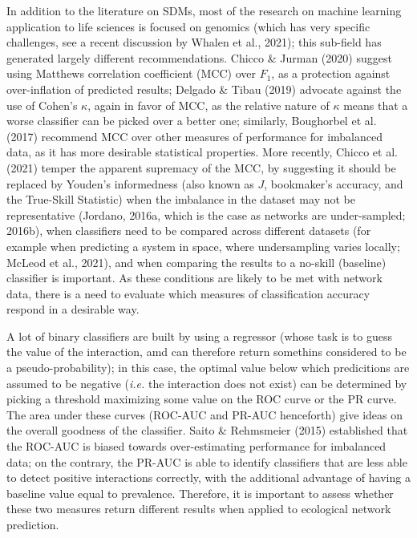 \documentclass[10pt,oneside]{article}
\begin{document}
In addition to the literature on SDMs, most of the research on machine
learning application to life sciences is focused on genomics (which has
very specific challenges, see a recent discussion by Whalen et al.,
2021); this sub-field has generated largely different recommendations.
Chicco \& Jurman (2020) suggest using Matthews correlation coefficient
(MCC) over \(F_1\), as a protection against over-inflation of predicted
results; Delgado \& Tibau (2019) advocate against the use of Cohen's
\(\kappa\), again in favor of MCC, as the relative nature of \(\kappa\)
means that a worse classifier can be picked over a better one;
similarly, Boughorbel et al. (2017) recommend MCC over other measures of
performance for imbalanced data, as it has more desirable statistical
properties. More recently, Chicco et al. (2021) temper the apparent
supremacy of the MCC, by suggesting it should be replaced by Youden's
informedness (also known as \(J\), bookmaker's accuracy, and the
True-Skill Statistic) when the imbalance in the dataset may not be
representative (Jordano, 2016a, which is the case as networks are
under-sampled; 2016b), when classifiers need to be compared across
different datasets (for example when predicting a system in space, where
undersampling varies locally; McLeod et al., 2021), and when comparing
the results to a no-skill (baseline) classifier is important. As these
conditions are likely to be met with network data, there is a need to
evaluate which measures of classification accuracy respond in a
desirable way.

A lot of binary classifiers are built by using a regressor (whose task
is to guess the value of the interaction, amd can therefore return
somethins considered to be a pseudo-probability); in this case, the
optimal value below which predicitions are assumed to be negative
(\emph{i.e.} the interaction does not exist) can be determined by
picking a threshold maximizing some value on the ROC curve or the PR
curve. The area under these curves (ROC-AUC and PR-AUC henceforth) give
ideas on the overall goodness of the classifier. Saito \& Rehmsmeier
(2015) established that the ROC-AUC is biased towards over-estimating
performance for imbalanced data; on the contrary, the PR-AUC is able to
identify classifiers that are less able to detect positive interactions
correctly, with the additional advantage of having a baseline value
equal to prevalence. Therefore, it is important to assess whether these
two measures return different results when applied to ecological network
prediction.
\end{document}
